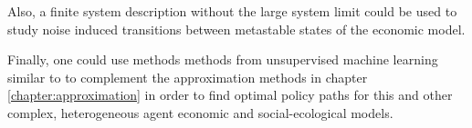 Also, a finite system description without the large system limit could be used to study noise induced transitions between metastable states \citep{VandenBroeck1994, Klemm2003} of the economic model.


Finally, one could use methods methods from unsupervised machine learning similar to \cite{Strnad2019} to complement the approximation methods in chapter \ref{chapter:approximation} in order to find optimal policy paths for this and other complex, heterogeneous agent economic and social-ecological models.

